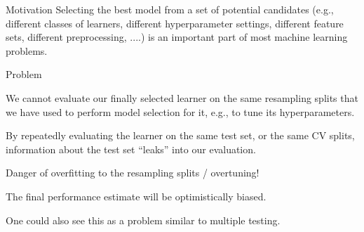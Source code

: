 \documentclass[11pt,compress,t,notes=noshow, xcolor=table]{beamer}
\begin{document}


\begin{vbframe}{Motivation}
Selecting the best model from a set of potential candidates (e.g., different classes of learners, different hyperparameter settings, different feature sets, different preprocessing, ....) is an important part of most  machine learning problems.
\vspace{-1ex}
\begin{blocki}{Problem}
    \item We cannot evaluate our finally selected learner on the same resampling splits that we have used to perform model selection for it, e.g., to tune its hyperparameters.
    \item By repeatedly evaluating the learner on the same test set, or the same CV splits, information
      about the test set \enquote{leaks} into our evaluation.
    \item Danger of overfitting to the resampling splits / overtuning!
    \item The final performance estimate will be optimistically biased.
    \item One could also see this as a problem similar to multiple testing.
\end{blocki}
\end{vbframe}
\end{document}
